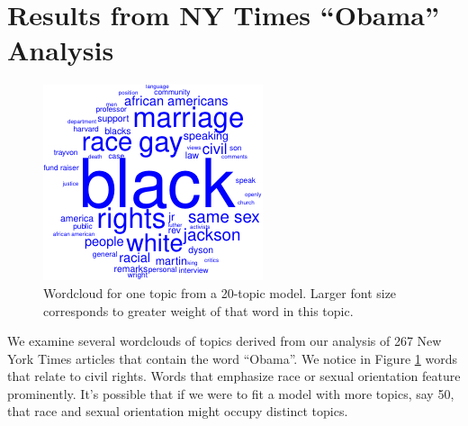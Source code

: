 \documentclass[12pt,]{article}
\begin{document}
\section{\texorpdfstring{Results from NY Times ``Obama''
Analysis}{Results from NY Times Obama Analysis}}\label{results-from-ny-times-obama-analysis}

\begin{figure}
\includegraphics[width=\textwidth]{2016-03-17-obama_files/figure-latex/wordcloud-3.pdf}
\caption{Wordcloud for one topic from a 20-topic model. Larger font size corresponds to greater weight of that word in this topic.\label{fig:wc3}}
\end{figure}

We examine several wordclouds of topics derived from our analysis of 267
New York Times articles that contain the word ``Obama''. We notice in
Figure \ref{fig:wc3} words that relate to civil rights. Words that
emphasize race or sexual orientation feature prominently. It's possible
that if we were to fit a model with more topics, say 50, that race and
sexual orientation might occupy distinct topics.
\end{document}
